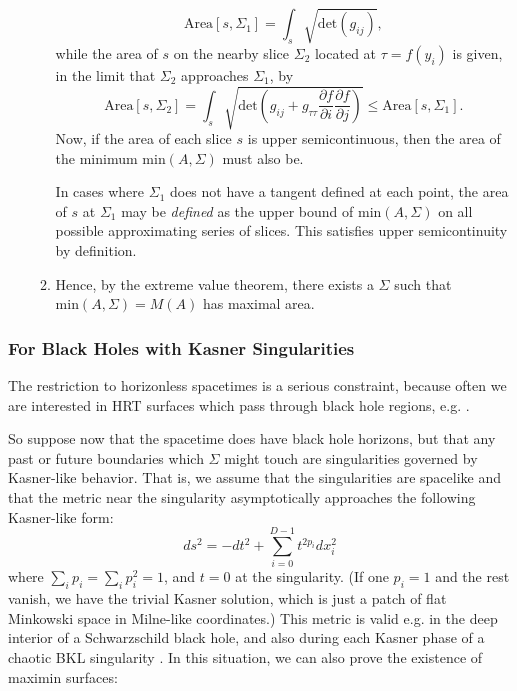 \documentclass{article}
\begin{document}
\begin{enumerate}[resume]
\begin{enumerate}
\begin{equation}
\mathrm{Area}[s, \Sigma_1] = \int_{s} \sqrt{\mathrm{det}(g_{ij})},
\end{equation}
while the area of $s$ on the nearby slice $\Sigma_2$ located at $\tau = f(y_i)$ is given, in the limit that $\Sigma_2$ approaches $\Sigma_1$, by
\begin{equation}\label{sigma_2}
\mathrm{Area}[s, \Sigma_2] = \int_{s} \sqrt{ \mathrm{det} 
\left( g_{ij} + g_{\tau\tau} \frac{\partial f}{\partial i}\frac{\partial f}{\partial j} \right) } \le \mathrm{Area}[s, \Sigma_1].
\end{equation}
Now, if the area of each slice $s$ is upper semicontinuous, then the area of the minimum $\mathrm{min}(A,\Sigma)$ must also be.  

In cases where $\Sigma_1$ does not have a tangent defined at each point, the area of $s$ at $\Sigma_1$ may be \emph{defined} as the upper bound of $\mathrm{min}(A,\Sigma)$ on all possible approximating series of slices.  This satisfies upper semicontinuity by definition.
	\item Hence, by the extreme value theorem, there exists a $\Sigma$ such that $\mathrm{min}(A,\Sigma) = M(A)$ has maximal area.
	\end{enumerate}
\end{enumerate}

\subsubsection{For Black Holes with Kasner Singularities}\label{Kasner}

The restriction to horizonless spacetimes is a serious constraint, because often we are interested in HRT surfaces which pass through black hole regions, e.g. \cite{HM13}.

So suppose now that the spacetime does have black hole horizons, but that any past or future boundaries which $\Sigma$ might touch are singularities governed by Kasner-like behavior.  That is, we assume that the singularities are spacelike and that the metric near the singularity asymptotically approaches the following Kasner-like form:
\begin{equation}
ds^2 = -dt^2 + \sum_{i=0}^{D-1} t^{2p_i} dx_i^2
\end{equation}
where $\sum_i p_i = \sum_i p_i^2 = 1$, and $t = 0$ at the singularity.  (If one $p_i = 1$ and the rest vanish, we have the trivial Kasner solution, which is just a patch of flat Minkowski space in Milne-like coordinates.) This metric is valid e.g. in the deep interior of a Schwarzschild black hole, and also during each Kasner phase of a chaotic BKL singularity \cite{BKL70}.  In this situation, we can also prove the existence of maximin surfaces:
\end{document}
